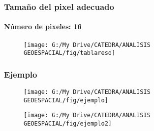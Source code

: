 \documentclass[14pt]{beamer}
\begin{document}
\begin{frame}
\frametitle{Tamaño del pixel adecuado}
\framesubtitle{Número de pixeles: 16}
 \begin{figure}
    \centering
    \texttt{[image: G:/My Drive/CATEDRA/ANALISIS GEOESPACIAL/fig/tablareso]}
  \end{figure}
\end{frame}
\begin{frame}
\frametitle{Ejemplo}
 \begin{figure}
    \centering
    \texttt{[image: G:/My Drive/CATEDRA/ANALISIS GEOESPACIAL/fig/ejemplo]}
  \end{figure}
\end{frame}
\begin{frame}
\begin{figure}
    \centering
    \texttt{[image: G:/My Drive/CATEDRA/ANALISIS GEOESPACIAL/fig/ejemplo2]}
  \end{figure}
\end{frame}
\end{document}
